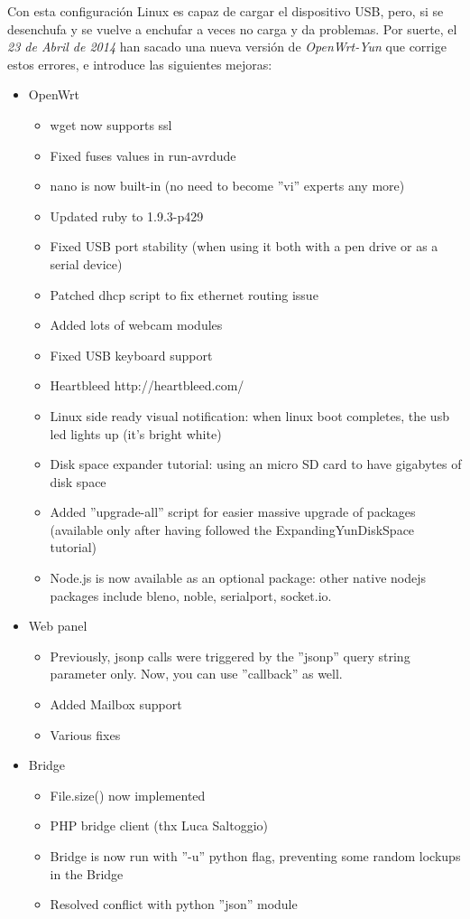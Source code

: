 Con esta configuración Linux es capaz de cargar el dispositivo USB, pero, si se desenchufa y se vuelve a enchufar a veces no carga y da problemas. Por suerte, el \emph{23 de Abril de 2014} han sacado una nueva versión de \emph{OpenWrt-Yun} que corrige estos errores, e introduce las siguientes mejoras:

	\begin{itemize}
		\item OpenWrt
			\begin{itemize}
 				\item wget now supports ssl
 				\item Fixed fuses values in run-avrdude
 				\item nano is now built-in (no need to become ''vi'' experts any more)
 				\item Updated ruby to 1.9.3-p429
 				\item Fixed USB port stability (when using it both with a pen drive or as a serial device)
 				\item Patched dhcp script to fix ethernet routing issue
 				\item Added lots of webcam modules
 				\item Fixed USB keyboard support
 				\item Heartbleed http://heartbleed.com/
 				\item Linux side ready visual notification: when linux boot completes, the usb led lights up (it's bright white)
 				\item Disk space expander tutorial: using an micro SD card to have gigabytes of disk space
 				\item Added ''upgrade-all'' script for easier massive upgrade of packages (available only after having followed the ExpandingYunDiskSpace tutorial)
 				\item Node.js is now available as an optional package: other native nodejs packages include bleno, noble, serialport, socket.io.
			\end{itemize}

		\item Web panel
			\begin{itemize}
				\item Previously, jsonp calls were triggered by the ''jsonp'' query string parameter only. Now, you can use ''callback'' as well.
				\item Added Mailbox support
				\item Various fixes
			\end{itemize}

		\item Bridge
			\begin{itemize}
				\item File.size() now implemented
				\item PHP bridge client (thx Luca Saltoggio)
				\item Bridge is now run with ''-u'' python flag, preventing some random lockups in the Bridge
				\item Resolved conflict with python ''json'' module
			\end{itemize}
	\end{itemize}

